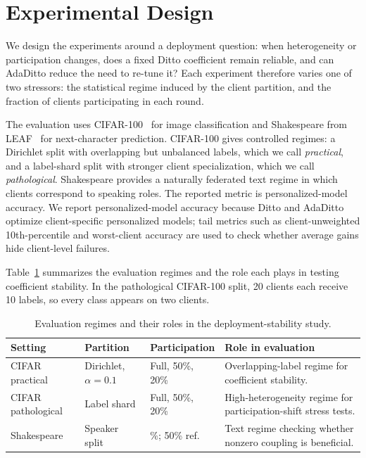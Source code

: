 \documentclass[letterpaper]{article} %
\begin{document}
\section{Experimental Design}
\label{sec:experimental}

We design the experiments around a deployment question: when
heterogeneity or participation changes, does a fixed Ditto coefficient
remain reliable, and can AdaDitto reduce the need to re-tune it? Each
experiment therefore varies one of two stressors: the statistical
regime induced by the client partition, and the fraction of clients
participating in each round.

The evaluation uses CIFAR-100~\cite{krizhevsky2009learning} for image
classification and Shakespeare from LEAF~\cite{caldas2018leaf} for
next-character prediction. CIFAR-100 gives controlled regimes: a
Dirichlet split with overlapping but unbalanced labels, which we call
\emph{practical}, and a label-shard split with stronger client
specialization, which we call \emph{pathological}. Shakespeare provides
a naturally federated text regime in which clients correspond to
speaking roles. The reported metric is personalized-model accuracy.
We report personalized-model accuracy because Ditto and AdaDitto optimize client-specific personalized models; tail metrics such as client-unweighted 10th-percentile and worst-client accuracy are used to check whether average gains hide client-level failures.

Table~\ref{tab:evaluation-regimes} summarizes the evaluation
regimes and the role each plays in testing coefficient stability.
In the pathological CIFAR-100 split, 20 clients each receive
10 labels, so every class appears on two clients.

\begin{table}[ht]
\centering
\scriptsize
\setlength{\tabcolsep}{3pt}
\renewcommand{\arraystretch}{1.08}
\begin{tabularx}{\columnwidth}{@{}>{\raggedright\arraybackslash}p{}>{\raggedright\arraybackslash}p{}>{\raggedright\arraybackslash}p{}>{\raggedright\arraybackslash}X@{}}
\toprule
Setting & Partition & Participation & Role in evaluation \\
\midrule
CIFAR practical &
Dirichlet, $\alpha=0.1$ &
Full, 50\%, 20\% &
Overlapping-label regime for coefficient stability. \\
CIFAR pathological &
Label shard &
Full, 50\%, 20\% &
High-heterogeneity regime for participation-shift stress tests. \\
Shakespeare &
Speaker split &
10\%; 50\% ref. &
Text regime checking whether nonzero coupling is beneficial. \\
\bottomrule
\end{tabularx}
\caption{Evaluation regimes and their roles in the deployment-stability study.}
\label{tab:evaluation-regimes}
\end{table}
\end{document}
